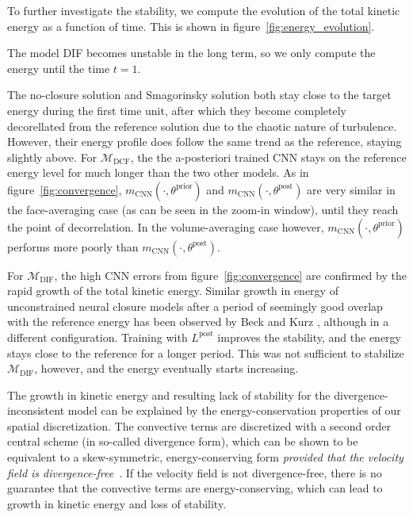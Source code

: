 \documentclass[preprint]{elsarticle}
\newcommand{\revboth}[1]{#1}
\begin{document}
To further investigate the stability, we compute the evolution of the total
kinetic energy as a function of time. This is shown in
figure~\ref{fig:energy_evolution}.
\revboth{
    The model DIF becomes unstable in the long term, so we only compute the
    energy until the time $t = 1$.
}
\revboth{
    
    The no-closure solution and Smagorinsky solution both stay close to the target energy
    during the first time unit, after which they become completely decorellated
    from the reference solution due to the chaotic nature of turbulence.
    However, their energy profile does follow the same trend as the reference,
    staying slightly above.
    For $\mathcal{M}_{\text{DCF}}$, the
    the a-posteriori trained CNN stays on the reference energy level for much longer
    than the two other models. As in figure~\ref{fig:convergence},
    $m_\text{CNN}(\cdot, \theta^\text{prior})$ and
    $m_\text{CNN}(\cdot, \theta^\text{post})$ are very similar in the face-averaging case
    (as can be seen in the zoom-in window), until they reach the point of decorrelation.
    In the volume-averaging case however, 
    $m_\text{CNN}(\cdot, \theta^\text{prior})$
    performs more poorly than 
    $m_\text{CNN}(\cdot, \theta^\text{post})$.
}
For $\mathcal{M}_{\text{DIF}}$, the high CNN errors from figure~\ref{fig:convergence} are
confirmed by the rapid growth of the total kinetic energy. Similar growth in
energy of unconstrained neural closure models after a period of seemingly good
overlap with the reference energy has been observed by Beck and Kurz
\cite{Beck2019,Kurz2021}, although in a different configuration. Training with
$L^\text{post}$ improves the stability, and the energy stays close to the
reference for a longer period. This was not sufficient to stabilize
$\mathcal{M}_{\text{DIF}}$, however, and the energy eventually starts increasing.

The growth in kinetic energy and resulting lack of stability for the
divergence-inconsistent model can be explained by the energy-conservation
properties of our spatial discretization. The convective terms are discretized
with a second order central scheme (in so-called divergence form), which can be
shown to be equivalent to a skew-symmetric, energy-conserving form
\textit{provided that the velocity field is divergence-free}~\cite{Verstappen2003}.
If the velocity field is not divergence-free, there is no
guarantee that the convective terms are energy-conserving, which can lead to
growth in kinetic energy and loss of stability. 
\end{document}
